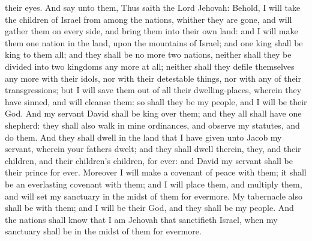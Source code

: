 their eyes. And say unto them, Thus saith the Lord Jehovah: Behold, I will take the children of Israel from among the nations, whither they are gone, and will gather them on every side, and bring them into their own land: and I will make them one nation in the land, upon the mountains of Israel; and one king shall be king to them all; and they shall be no more two nations, neither shall they be divided into two kingdoms any more at all; neither shall they defile themselves any more with their idols, nor with their detestable things, nor with any of their transgressions; but I will save them out of all their dwelling-places, wherein they have sinned, and will cleanse them: so shall they be my people, and I will be their God.  And my servant David shall be king over them; and they all shall have one shepherd: they shall also walk in mine ordinances, and observe my statutes, and do them. And they shall dwell in the land that I have given unto Jacob my servant, wherein your fathers dwelt; and they shall dwell therein, they, and their children, and their children’s children, for ever: and David my servant shall be their prince for ever. Moreover I will make a covenant of peace with them; it shall be an everlasting covenant with them; and I will place them, and multiply them, and will set my sanctuary in the midst of them for evermore. My tabernacle also shall be with them; and I will be their God, and they shall be my people. And the nations shall know that I am Jehovah that sanctifieth Israel, when my sanctuary shall be in the midst of them for evermore. 


